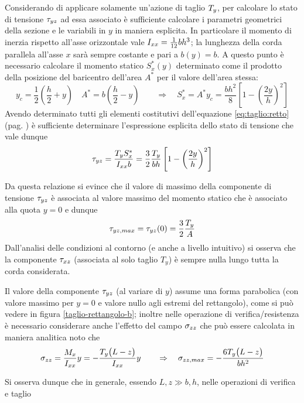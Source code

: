 		
		Considerando di applicare solamente un'azione di taglio $T_y$, per calcolare lo stato di tensione $\tau_{yz}$ ad essa associato è sufficiente calcolare i parametri geometrici della sezione e le variabili in $y$ in maniera esplicita. In particolare il momento di inerzia rispetto all'asse orizzontale vale $I_{xx} = \frac 1 {12}bh^3$; la lunghezza della corda parallela all'asse $x$ sarà sempre costante e pari a $b(y) = b$. A questo punto è necessario calcolare il momento statico $S^*_x(y)$ determinato come il prodotto della posizione del baricentro dell'area $A^*$ per il valore dell'area stessa:
		\[y_c = \frac 12\left( \frac h 2 + y\right) \quad A^* = b \left(\frac h 2 - y \right) \qquad \Rightarrow \quad S_x^* = A^* y_c = \frac{bh^2}{8} \left[ 1 - \left(\frac{2y}{h}\right)^2 \right]\]
		Avendo determinato tutti gli elementi costitutivi dell'equazione \ref{eq:taglio:retto} (pag. \pageref{eq:taglio:retto}) è sufficiente determinare l'espressione esplicita dello stato di tensione che vale dunque
		\begin{equation}
			\tau_{yz} = \frac{T_y S_x^*}{I_{xx} b} = \frac 3 2 \frac {T_y}{bh}  \left[ 1 - \left(\frac{2y}{h}\right)^2 \right]
		\end{equation}
		
		Da questa relazione si evince che il valore di massimo della componente di tensione $\tau_{yz}$ è associata al valore massimo del momento statico che è associato alla quota $y=0$ e dunque
		\[\tau_{yz,max} = \tau_{yz}(0) = \frac 3 2 \frac {T_y} A\] 
		Dall'analisi delle condizioni al contorno (e anche a livello intuitivo) si osserva che la componente $\tau_{xz}$ (associata al solo taglio $T_y$) è sempre nulla lungo tutta la corda considerata.
		
		Il valore della componente $\tau_{yz}$ (al variare di $y$) assume una forma parabolica (con valore massimo per $y=0$ e valore nullo agli estremi del rettangolo), come si può vedere in figura \ref{taglio-rettangolo-b}; inoltre nelle operazione di verifica/resistenza è necessario considerare anche l'effetto del campo $\sigma_{zz}$ che può essere calcolata in maniera analitica noto che
		\[ \sigma_{zz} = \frac {M_x} {I_{xx}} y = -\frac{T_y\big( L-z \big)}{I_{xx}} y \qquad \Rightarrow \quad \sigma_{zz,max}= - \frac{6T_y\big( L-z \big) }{bh^2}\]
		
		Si osserva dunque che in generale, essendo $L,z \gg b,h$, nelle operazioni di verifica e taglio
		
		
		
		
		